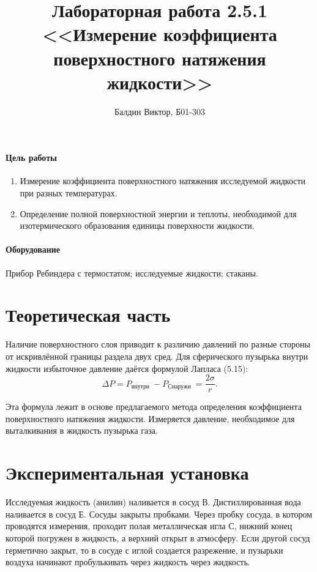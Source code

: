 \documentclass[12pt]{article}
\title{ 
Лабораторная работа 2.5.1 \\
<<Измерение коэффициента поверхностного натяжения жидкости>>
}
\author{Балдин Виктор, Б01-303}
\begin{document}
    \maketitle
    \paragraph{Цель работы}
    \begin{enumerate}
        \item Измерение коэффициента поверхностного натяжения исследуемой 
        жидкости при разных температурах.
        \item Определение полной поверхностной энергии и теплоты, необходимой
        для изотермического образования единицы поверхности жидкости.
    \end{enumerate}
    \paragraph{Оборудование}
    Прибор Ребиндера с термостатом; исследуемые жидкости; стаканы.
    
    \section{Теоретическая часть}
    Наличие поверхностного слоя приводит к различию давлений по разные стороны
    от искривлённой границы раздела двух сред. Для сферического пузырька внутри
    жидкости избыточное давление даётся формулой Лапласа (5.15):
    $$ \Delta P=P_{\text {внутри }}-P_{\text {Снаружи }}=\frac{2 \sigma}{r} .  $$

    Эта формула лежит в основе предлагаемого метода определения коэффициента
    поверхностного натяжения жидкости. Измеряется давление, необходимое для
    выталкивания в жидкость пузырька газа.

    \section{Экспериментальная установка}
    Исследуемая жидкость (анилин) наливается в сосуд В.
    Дистиллированная вода наливается в сосуд Е. Сосуды закрыты пробками. Через
    пробку сосуда, в котором проводятся измерения, проходит полая металлическая игла
    С, нижний конец которой погружен в жидкость, а верхний открыт в атмосферу. Если
    другой сосуд герметично закрыт, то в сосуде с иглой создается разрежение,
    и пузырьки воздуха начинают пробулькивать через жидкость через жидкость.
    
\end{document}
